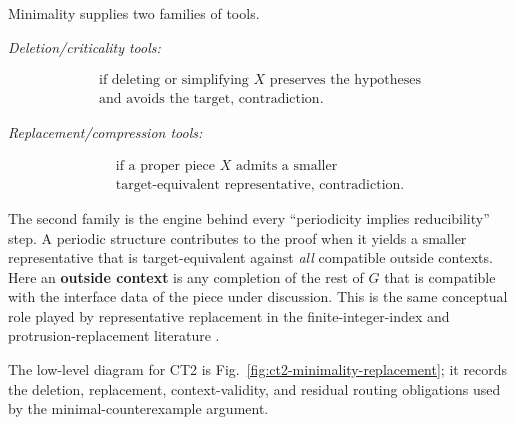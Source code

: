 Minimality supplies two families of tools.

\emph{Deletion/criticality tools:}

\[
\begin{gathered}
\text{if deleting or simplifying } X \text{ preserves the hypotheses}\\
\text{and avoids the target, contradiction.}
\end{gathered}
\]

\emph{Replacement/compression tools:}

\[
\begin{gathered}
\text{if a proper piece } X \text{ admits a smaller}\\
\text{target-equivalent representative, contradiction.}
\end{gathered}
\]

The second family is the engine behind every ``periodicity implies
reducibility'' step. A periodic structure contributes to the proof when
it yields a smaller representative that is target-equivalent against
\emph{all} compatible outside contexts. Here an \textbf{outside context}
is any completion of the rest of \(G\) that is compatible with the
interface data of the piece under discussion. This is the same
conceptual role played by representative replacement in the
finite-integer-index and protrusion-replacement literature
\citep{bodlaender-etal-2009-meta-kernelization, kim-etal-2012-protrusion, garnero-etal-2013-explicit-kernels, jansen-wulms-2016-lower-bounds}.

The low-level diagram for CT2 is Fig.~\ref{fig:ct2-minimality-replacement};
it records the deletion, replacement, context-validity, and residual
routing obligations used by the minimal-counterexample argument.
